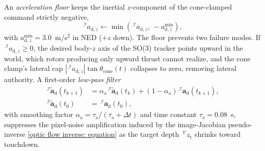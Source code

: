 \documentclass{IEEEtaes}
\begin{document}
An \emph{acceleration floor} keeps the inertial $z$-component of the cone-clamped command strictly negative,
\begin{equation} \label{acceleration floor: equation}
    \,^\mathcal{I}a_{\text{d},z}\leftarrow \min(\,^\mathcal{I}a_{\text{d},z},\,-a_{\text{d},z}^{\min}),
\end{equation}
with $a_{\text{d},z}^{\min}=3.0$~m/s$^2$ in NED ($+z$ down). The floor prevents two failure modes. If $\,^\mathcal{I}a_{\text{d},z}\ge 0$, the desired body-$z$ axis of the SO(3) tracker points upward in the world, which rotors producing only upward thrust cannot realize, and the cone clamp's lateral cap $|\,^\mathcal{I}a_{\text{d},z}|\tan\theta_\text{cone}(t)$ collapses to zero, removing lateral authority. A first-order \emph{low-pass filter}
\begin{align} \label{lpf: equation}
    \,^\mathcal{I}\!\tilde{\boldsymbol{a}}_\text{d}(t_{k+1}) &= \alpha_\text{a}\,^\mathcal{I}\!\tilde{\boldsymbol{a}}_\text{d}(t_k)+(1-\alpha_\text{a})\,^\mathcal{I}\!\boldsymbol{a}_\text{d}(t_{k+1}), \nonumber\\
    \,^\mathcal{I}\!\tilde{\boldsymbol{a}}_\text{d}(t_0) &= \,^\mathcal{I}\!\boldsymbol{a}_\text{d}(t_0),
\end{align}
with smoothing factor $\alpha_\text{a}=\tau_\text{a}/(\tau_\text{a}+\Delta t)$ and time constant $\tau_\text{a}=0.08$~s, suppresses the pixel-noise amplification induced by the image-Jacobian pseudo-inverse \eqref{optic flow inverse: equation} as the target depth $\,^\mathcal{V}z_\text{t}$ shrinks toward touchdown.
\end{document}
